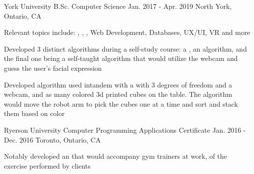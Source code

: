 

\begin{cventries}

  \cventry
    {York University} %
    {B.Sc. Computer Science} %
    {Jan. 2017 - Apr. 2019} %
    {North York, Ontario, CA} %
    {
      \begin{cvitems} %
        \item {Relevant topics include: , , , Web Development, Databases, UX/UI, VR and more}
        \item {Developed 3 distinct  algorithms during a self-study course: a , an  algorithm, and the final one being a self-taught  algorithm that would utilize the webcam and guess the user's facial expression}
        \item {Developed algorithm used intandem with a  with 3 degrees of freedom and a webcam, and as many colored 3d printed cubes on the table. The algorithm would move the robot arm to pick the cubes one at a time and sort and stack them based on color}
      \end{cvitems}
    }


  \cventry
  {Ryerson University} %
  {Computer Programming Applications Certificate} %
  {Jan. 2016 - Dec. 2016} %
  {Toronto, Ontario, CA} %
  {
    \begin{cvitems} %
      \item {Notably developed an  that would accompany gym trainers at work,  of the exercise performed by clients}
    \end{cvitems}
  }

\end{cventries}